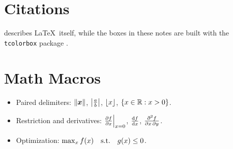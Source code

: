 \section{Citations}
%
\cite{lamport1994} describes \LaTeX\ itself, while the boxes in these notes are built with the \texttt{tcolorbox} package \citep{tcolorbox}.
%
\section{Math Macros}
%
\begin{itemize}
    \item Paired delimiters: $\norm{\bs x}$, $\abs*{\frac{a}{b}}$, $\floor{x}$, $\cb{x\in\R:x>0}$.
    \item Restriction and derivatives: $\restrict{\pd{f}{x}}{x=0}$, $\odv{f}{x}$, $\pdv{f}{x,y}$.
    \item Optimization: $\max_{x}f(x)\st g(x)\le 0$.
\end{itemize}
